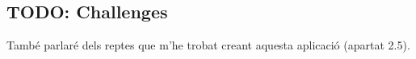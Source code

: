 
\subsection{TODO: Challenges}

També parlaré dels reptes que m'he trobat creant aquesta aplicació (apartat
2.5).